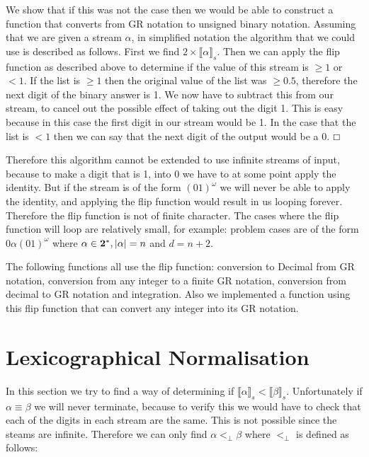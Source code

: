 \documentclass{cs4rep}
\begin{document}
We show that if this was not the case then we would be able to
construct a function that converts from GR notation to unsigned binary
notation. Assuming that we are given a stream $\alpha$, in simplified
notation the algorithm that we could use is described as follows.
First we find $2 \times \llbracket \alpha \rrbracket_{s} $. Then we
can apply the flip function as described above to determine if the
value of this stream is $\geq 1$ or $< 1$. If the list is $\geq 1$
then the original value of the list was $\geq 0.5$, therefore the next
digit of the binary answer is 1. We now have to subtract this from our
stream, to cancel out the possible effect of taking out the digit 1.
This is easy because in this case the first digit in our stream would
be 1. In the case that the list is $< 1$ then we can say that the next
digit of the output would be a 0. \hfill $\boxempty$

Therefore this algorithm cannot be extended to use infinite streams
of input, because to make a digit that is 1, into 0 we have to at some
point apply the identity. But if the stream is of the form
$(01)^{\omega}$ we will never be able to apply the identity, and
applying the flip function would result in us looping forever.
Therefore the flip function is not of finite character. The cases
where the flip function will loop are relatively small, for example:
problem cases are of the form $0\alpha(01)^{\omega}$ where $\alpha \in
{\bf 2^{*}}, |\alpha| = n$ and $d=n+2$.

The following functions all use the flip function:
conversion to Decimal from GR notation, conversion from any integer to
a finite GR notation, conversion from decimal to GR notation and
integration. Also we implemented a function using this flip function
that can convert any integer into its GR notation.


\section{Lexicographical Normalisation} \label{sec:lex}

In this section we try to find a way of determining if $ \llbracket
\alpha \rrbracket_{s} < \llbracket \beta \rrbracket_{s}$. Unfortunately
if $\alpha \equiv \beta$ we will never terminate, because to verify
this we would have to check that each of the digits in each stream are
the same. This is not possible since the steams are infinite.
Therefore we can only find $\alpha<_{\perp}\beta$ where $<_{\perp}$ is
defined as follows:
\end{document}
